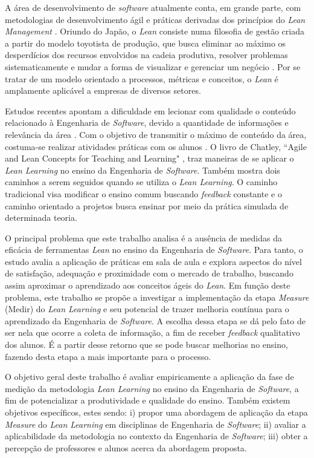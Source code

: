 A área de desenvolvimento de \textit{software} atualmente conta, em grande parte, com metodologias de desenvolvimento ágil e práticas derivadas dos princípios do \textit{Lean Management} \cite{poth2019lean}. Oriundo do Japão, o \textit{Lean} consiste numa filosofia de gestão criada a partir do modelo toyotista de produção, que busca eliminar ao máximo os desperdícios dos recursos envolvidos na cadeia produtiva, resolver problemas sistematicamente e mudar a forma de visualizar e gerenciar um negócio \cite{shingo2019study}. Por se tratar de um modelo orientado a processos, métricas e conceitos, o \textit{Lean} é amplamente aplicável a empresas de diversos setores.

Estudos recentes apontam a dificuldade em lecionar com qualidade o conteúdo relacionado à Engenharia de \textit{Software}, devido a quantidade de informações e relevância da área \cite{EnsinoEng2014} \cite{chatley2017lean} \cite{marques2017enhancing}. Com o objetivo de transmitir o máximo de conteúdo da área, costuma-se realizar atividades práticas com os alunos \cite{EnsinoEng2014}. O livro de Chatley, ``Agile and Lean Concepts for Teaching and Learning" \nocite{ChatleyBook2019}, traz maneiras de se aplicar o \textit{Lean Learning} no ensino da Engenharia de \textit{Software}. Também mostra dois caminhos a serem seguidos quando se utiliza o \textit{Lean Learning}. O caminho tradicional visa modificar o ensino comum buscando \textit{feedback} constante e o caminho orientado a projetos busca ensinar por meio da prática simulada de determinada teoria.

O principal problema que este trabalho analisa é a ausência de medidas da eficácia de ferramentas \textit{Lean} no ensino da Engenharia de \textit{Software}. Para tanto, o estudo avalia a aplicação de práticas em sala de aula e explora aspectos do nível de satisfação, adequação e proximidade com o mercado de trabalho, buscando assim aproximar o aprendizado aos conceitos ágeis do \textit{Lean}. Em função deste problema, este trabalho se propõe a investigar a implementação da etapa \textit{Measure} (Medir) do \textit{Lean Learning} e seu potencial de trazer melhoria contínua para o aprendizado da Engenharia de \textit{Software}. A escolha dessa etapa se dá pelo fato de ser nela que ocorre a coleta de informação, a fim de receber \textit{feedback} qualitativo dos alunos. É a partir desse retorno que se pode buscar melhorias no ensino, fazendo desta etapa a mais importante para o processo.

O objetivo geral deste trabalho é avaliar empiricamente a aplicação da fase de medição da metodologia \textit{Lean Learning} no ensino da Engenharia de \textit{Software}, a fim de potencializar a produtividade e qualidade do ensino. Também existem objetivos específicos, estes sendo: i) propor uma abordagem de aplicação da etapa \textit{Measure} do \textit{Lean Learning} em disciplinas de Engenharia de \textit{Software}; ii) avaliar a aplicabilidade da metodologia no contexto da Engenharia de \textit{Software}; iii) obter a percepção de professores e alunos acerca da abordagem proposta.

